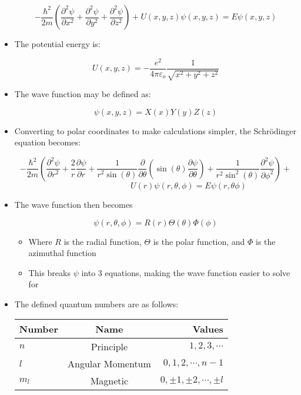 \begin{itemize}
    $$-\dfrac{\hbar^2}{2m}\left( \dfrac{\partial^2\psi}{\partial x^2} + \dfrac{\partial^2\psi}{\partial y^2} + \dfrac{\partial^2\psi}{\partial z^2} \right)+U(x,y,z)\psi(x,y,z)=E\psi(x,y,z)$$

  \item The potential energy is:

    $$U(x,y,z)=-\dfrac{e^2}{4\pi\varepsilon_o}\dfrac{1}{\sqrt{x^2+y^2+z^2}}$$

  \item The wave function may be defined as:

    $$\psi(x,y,z)=X(x)Y(y)Z(z)$$

  \item Converting to polar coordinates to make calculations simpler, the Schr\"odinger equation becomes:

    $$-\dfrac{\hbar^2}{2m}\left( \dfrac{\partial^2\psi}{\partial r^2} + \dfrac{2}{r}\dfrac{\partial\psi}{\partial r}+\dfrac{1}{r^2\sin(\theta)}\dfrac{\partial}{\partial\theta}\left(\sin(\theta)\dfrac{\partial\psi}{\partial\theta}\right)+\dfrac{1}{r^2\sin^2(\theta)}\dfrac{\partial^2\psi}{\partial\phi^2}\right)+$$$$\quad\quad\quad\quad\quad\quad\quad\quad U(r)\psi(r,\theta,\phi)=E\psi(r,\theta\phi)$$

  \item The wave function then becomes

    $$\psi(r,\theta,\phi)=R(r)\Theta(\theta)\Phi(\phi)$$

    \begin{itemize}

      \item Where $R$ is the radial function, $\Theta$ is the polar function, and $\Phi$ is the azimuthal function

      \item This breaks $\psi$ into 3 equations, making the wave function easier to solve for

    \end{itemize}

  \item The defined quantum numbers are as follows:

    \begin{center}
      \begin{tabular}[h!]{| l | c | r |}
        \hline
        Number & Name & Values\\
        \hline
        $n$ & Principle & $1,2,3,\cdots$\\
        \hline
        $l$ & Angular Momentum & $0,1,2,\cdots,n-1$\\
        \hline
        $m_l$ & Magnetic & $0,\pm1,\pm2,\cdots,\pm l$\\
        \hline
      \end{tabular}
    \end{center}

\end{itemize}




